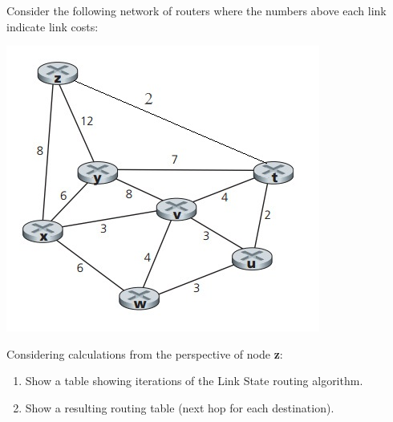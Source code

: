 \documentclass{report}
\begin{document}
\mktitle

\begin{problem}
Consider the following network of routers where the numbers above each link indicate link costs:
\begin{center}
\includegraphics[scale = 0.7]{hw7-q1.jpg}
\end{center}

Considering calculations from the perspective of node \textbf{z}:

\begin{enumerate}
\item Show a table showing iterations of the Link State routing algorithm.
\item Show a resulting routing table (next hop for each destination).
\end{enumerate}



\end{problem}
\end{document}
